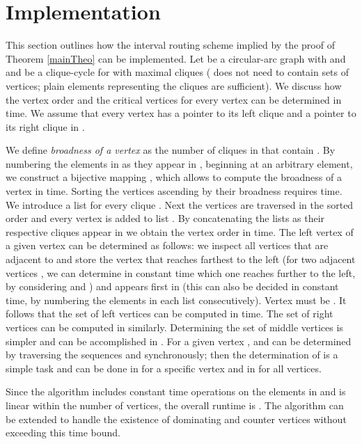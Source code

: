 \documentclass[10pt]{article}
\begin{document}
\section{Implementation}\label{implement}


This section outlines how the interval routing scheme implied by the proof 
of Theorem \ref{mainTheo} can be implemented.
Let  be a circular-arc graph with  and  and 
 be a clique-cycle for  with 
maximal cliques ( does not need to contain sets of vertices; plain 
elements representing the cliques are sufficient).
We discuss how the vertex order  and the critical vertices 
 for every vertex  can be determined in  time.
We assume that every vertex  has a pointer  to 
its left clique and a pointer  to its right clique in .


We define \emph{broadness of a vertex } as the number of cliques 
in  that contain .
By numbering the elements in  as they appear in , beginning at 
an arbitrary element, we construct a bijective mapping 
, which allows to compute the 
broadness of a vertex in   time.
Sorting the vertices ascending by their broadness 
requires  time. We introduce a list  for 
every clique . Next the vertices are traversed in the sorted order and 
every vertex  is added to list .
By concatenating the lists as their respective cliques appear in  we obtain the vertex order
 in  time.
The left vertex  of a given vertex  can be determined as follows:
we inspect all vertices that are adjacent to  and store the vertex  that reaches 
farthest to the left (for two adjacent vertices , we can determine in constant time 
which one reaches further to the left, by considering  and ) 
and appears first in  (this can also be decided in constant time, by numbering 
the elements in each list consecutively). Vertex  must be .
It follows that the set of left vertices can be computed in  time.
The set of right vertices can be computed in similarly.
Determining the set of middle vertices is simpler and can be accomplished in 
.
For a given vertex ,  and  can be determined by traversing 
the sequences  and  synchronously; 
then the determination of   is a simple task and can be done in 
for a specific vertex and in  for all vertices.

Since the algorithm includes constant time operations on the elements in  
and  is linear within the number of vertices, the overall runtime 
is .
The algorithm can be extended to  handle the existence of dominating 
and counter vertices without exceeding this time bound.
\end{document}
